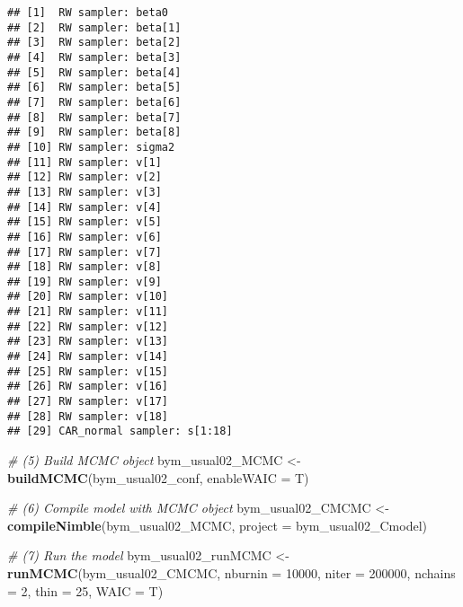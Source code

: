 \documentclass[]{article}
\newenvironment{Shaded}{\begin{snugshade}}{\end{snugshade}}
\newcommand{\CommentTok}[1]{\textcolor[rgb]{0.56,0.35,0.01}{\textit{#1}}}
\newcommand{\DataTypeTok}[1]{\textcolor[rgb]{0.13,0.29,0.53}{#1}}
\newcommand{\DecValTok}[1]{\textcolor[rgb]{0.00,0.00,0.81}{#1}}
\newcommand{\KeywordTok}[1]{\textcolor[rgb]{0.13,0.29,0.53}{\textbf{#1}}}
\newcommand{\NormalTok}[1]{#1}
\newcommand{\OperatorTok}[1]{\textcolor[rgb]{0.81,0.36,0.00}{\textbf{#1}}}
\newcommand{\StringTok}[1]{\textcolor[rgb]{0.31,0.60,0.02}{#1}}
\begin{document}
\begin{Shaded}
\end{Shaded}

\begin{verbatim}
## [1]  RW sampler: beta0
## [2]  RW sampler: beta[1]
## [3]  RW sampler: beta[2]
## [4]  RW sampler: beta[3]
## [5]  RW sampler: beta[4]
## [6]  RW sampler: beta[5]
## [7]  RW sampler: beta[6]
## [8]  RW sampler: beta[7]
## [9]  RW sampler: beta[8]
## [10] RW sampler: sigma2
## [11] RW sampler: v[1]
## [12] RW sampler: v[2]
## [13] RW sampler: v[3]
## [14] RW sampler: v[4]
## [15] RW sampler: v[5]
## [16] RW sampler: v[6]
## [17] RW sampler: v[7]
## [18] RW sampler: v[8]
## [19] RW sampler: v[9]
## [20] RW sampler: v[10]
## [21] RW sampler: v[11]
## [22] RW sampler: v[12]
## [23] RW sampler: v[13]
## [24] RW sampler: v[14]
## [25] RW sampler: v[15]
## [26] RW sampler: v[16]
## [27] RW sampler: v[17]
## [28] RW sampler: v[18]
## [29] CAR_normal sampler: s[1:18]
\end{verbatim}

\begin{Shaded}
\begin{Highlighting}[]
\CommentTok{# (5) Build MCMC object}
\NormalTok{bym_usual02_MCMC <-}\StringTok{ }\KeywordTok{buildMCMC}\NormalTok{(bym_usual02_conf, }\DataTypeTok{enableWAIC =}\NormalTok{ T) }

\CommentTok{# (6) Compile model with MCMC object}
\NormalTok{bym_usual02_CMCMC <-}\StringTok{ }\KeywordTok{compileNimble}\NormalTok{(bym_usual02_MCMC, }\DataTypeTok{project =}\NormalTok{ bym_usual02_Cmodel)  }

\CommentTok{# (7) Run the model}
\NormalTok{bym_usual02_runMCMC <-}\StringTok{ }\KeywordTok{runMCMC}\NormalTok{(bym_usual02_CMCMC, }\DataTypeTok{nburnin =} \DecValTok{10000}\NormalTok{, }\DataTypeTok{niter =} \DecValTok{200000}\NormalTok{, }\DataTypeTok{nchains =} \DecValTok{2}\NormalTok{, }\DataTypeTok{thin =} \DecValTok{25}\NormalTok{, }\DataTypeTok{WAIC =}\NormalTok{ T)}
\end{Highlighting}
\end{Shaded}
\end{document}
